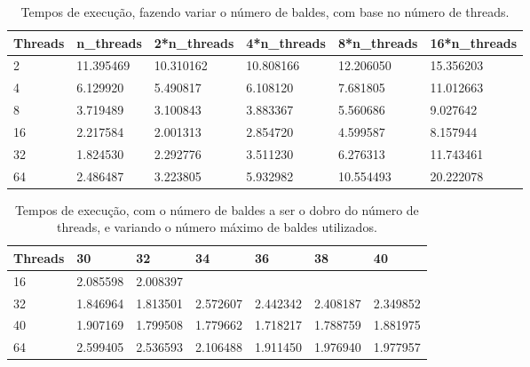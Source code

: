 \documentclass[a4paper]{report}
\begin{document}
\begin{table}[h!]
    \centering
    \begin{tabular}{|l|l|l|l|l|l|}
        \hline
        Threads & n\_threads & 2*n\_threads & 4*n\_threads & 8*n\_threads & 16*n\_threads \\ \hline
        2       & 11.395469  & 10.310162    & 10.808166    & 12.206050    & 15.356203     \\ \hline
        4       & 6.129920   & 5.490817     & 6.108120     & 7.681805     & 11.012663     \\ \hline
        8       & 3.719489   & 3.100843     & 3.883367     & 5.560686     & 9.027642      \\ \hline
        16      & 2.217584   & 2.001313     & 2.854720     & 4.599587     & 8.157944      \\ \hline
        32      & 1.824530   & 2.292776     & 3.511230     & 6.276313     & 11.743461     \\ \hline
        64      & 2.486487   & 3.223805     & 5.932982     & 10.554493    & 20.222078     \\ \hline
    \end{tabular}
    \caption{\label{tab:var_size}Tempos de execução, fazendo variar o
    número de baldes, com base no número de threads.}
\end{table}

\begin{table}[h]
    \centering
    \begin{tabular}{|l|l|l|l|l|l|l|}
        \hline
        Threads & 30       & 32       & 34       & 36       & 38       & 40       \\ \hline
        16      & 2.085598 & 2.008397 &          &          &          &          \\ \hline
        32      & 1.846964 & 1.813501 & 2.572607 & 2.442342 & 2.408187 & 2.349852 \\ \hline
        40      & 1.907169 & 1.799508 & 1.779662 & 1.718217 & 1.788759 & 1.881975 \\ \hline
        64      & 2.599405 & 2.536593 & 2.106488 & 1.911450 & 1.976940 & 1.977957 \\ \hline
    \end{tabular}
    \caption{\label{tab:cutoff}Tempos de execução, com o número de baldes a ser o
    dobro do número de threads, e variando o número máximo de baldes
    utilizados.}
\end{table}
\end{document}
